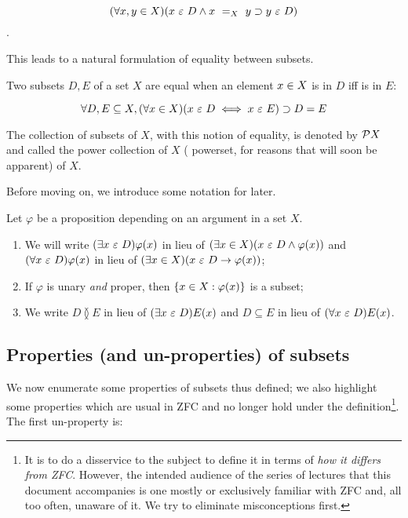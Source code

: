 \[
  (\forall x,y \in X)(x\ \varepsilon\ D \wedge x\ =_X\ y \supset y\ \varepsilon\ D)
\].

This leads to a natural formulation of equality between subsets.

\begin{definition}
  Two subsets \(D, E\) of a set $X$ are equal when an element \(x \in X\) is
  in \(D\) iff is in \(E\):

  \[
    \forall D, E \subseteq X,
    (\forall x \in X)(x\ \varepsilon\ D \iff x\ \varepsilon\ E) \supset D = E
  \]  
\end{definition}

The collection of subsets of \(X\), with this notion of equality, is denoted by
\(\mathcal{P}X\) and called the power collection of $X$ ( powerset,
for reasons that will soon be apparent) of \(X\).

Before moving on, we introduce some notation for later.

\begin{notation}
  Let \(\varphi\) be a proposition depending on an argument in a set \(X\).

  \begin{enumerate}
  \item We will write \((\exists x\ \varepsilon\ D)\varphi(x)\) in lieu of
    \((\exists x \in X)(x\ \varepsilon\ D \wedge \varphi(x))\) and
    \((\forall x\ \varepsilon\ D)\varphi(x)\) in lieu of
    \((\exists x \in X)(x\ \varepsilon\ D \rightarrow \varphi(x))\);
  \item If \(\varphi\) is unary \emph{and} proper, then
    \(\{x \in X : \varphi(x) \}\) is a subset;
  \item We write \(D \between E\) in lieu of \((\exists x\ \varepsilon\ D)E(x)\)
    and \(D \subseteq E\) in lieu of \((\forall x\ \varepsilon\ D)E(x)\).
  \end{enumerate}
\end{notation}

\subsection{Properties (and un-properties) of subsets}

We now enumerate some properties of subsets thus defined; we also
highlight some properties which are usual in ZFC and no longer hold
under the definition\footnote{It is to do a disservice to the subject
  to define it in terms of \emph{how it differs from ZFC}.  However,
  the intended audience of the series of lectures that this document
  accompanies is one mostly or exclusively familiar with ZFC and, all
  too often, unaware of it. We try to eliminate misconceptions
  first.}.
The first un-property is:

